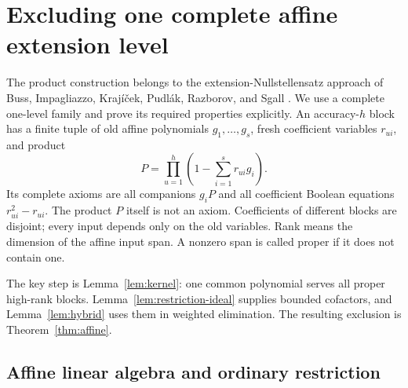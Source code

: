 \section{Excluding one complete affine extension level}\label{sec:affine}

The product construction belongs to the extension-Nullstellensatz approach
of Buss, Impagliazzo, Kraj\'i\v{c}ek, Pudl\'ak, Razborov, and Sgall
\cite{BIKPRS}. We use a complete one-level family and prove its required
properties explicitly. An accuracy-\(h\) block has a finite tuple of old
affine polynomials \(g_1,\ldots,g_s\), fresh coefficient variables
\(r_{ui}\), and product
\begin{equation}\label{eq:block}
 P=\prod_{u=1}^h\left(1-\sum_{i=1}^s r_{ui}g_i\right).
\end{equation}
Its complete axioms are all companions \(g_iP\) and all coefficient
Boolean equations \(r_{ui}^2-r_{ui}\). The product \(P\) itself is not an
axiom. Coefficients of different blocks are disjoint; every input depends
only on the old variables. Rank means the dimension of the affine input
span. A nonzero span is called proper if it does not contain one.

The key step is Lemma~\ref{lem:kernel}: one common polynomial serves all
proper high-rank blocks. Lemma~\ref{lem:restriction-ideal} supplies bounded
cofactors, and Lemma~\ref{lem:hybrid} uses them in weighted elimination.
The resulting exclusion is Theorem~\ref{thm:affine}.

\subsection{Affine linear algebra and ordinary restriction}

